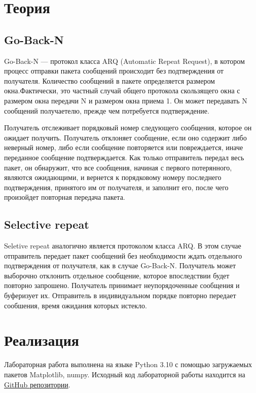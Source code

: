 \documentclass[12pt,a4paper]{article}
\begin{document}
	\newpage
	
	\section{Теория}
            \subsection{Go-Back-N}
                Go-Back-N — протокол класса ARQ (Automatic Repeat Request), в котором процесс отправки пакета сообщений происходит без подтверждения от получателя. Количество сообщений в пакете определяется размером окна.Фактически, это частный случай общего протокола скользящего окна с размером окна передачи N и размером окна приема 1. Он может передавать N сообщений получаетелю, прежде чем потребуется подтверждение.
    
                Получатель отслеживает порядковый номер следующего сообщения, которое он ожидает получить. Получатель отклоняет сообщение, если оно содержит либо неверный номер, либо если сообщение повторяется или повреждается, иначе переданное сообщение подтверждается. Как только отправитель передал весь пакет, он обнаружит, что все сообщения, начиная с первого потерянного, являются ожидающими, и вернется к порядковому номеру последнего подтверждения, принятого им от получателя, и заполнит его, после чего произойдет повторная передача пакета.
            \subsection{Selective repeat}
                Seletive repeat аналогично является протоколом класса ARQ. В этом случае отправитель передает пакет сообщений без необходимости ждать отдельного подтверждения от получателя, как в случае Go-Back-N. Получатель может выборочно отклонить отдельное сообщение, которое впоследствии будет повторно запрошено. Получатель принимает неупорядоченные сообщения и буферизует их. Отправитель в индивидуальном порядке повторно передает сообшения, время ожидания которых истекло.
	\newpage
	
	\section{Реализация}
		Лабораторная работа выполнена на языке Python 3.10 с помощью загружаемых пакетов Matplotlib, numpy. Исходный код лабораторной работы находится на \href{https://github.com/Drusiand/SPbSTU_Computer_Networks.git}{GitHub репозитории}.
	\newpage
	
\end{document}
